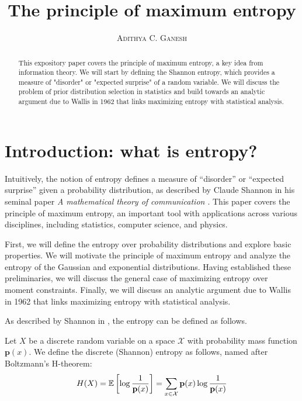\documentclass[13pt]{article}
\title{The principle of maximum entropy}
\author{\textsc{Adithya C. Ganesh}}
\newcommand{\p}{\mathbf{p}}
\begin{document}
\maketitle

\begin{abstract}
\noindent This expository paper covers the principle of maximum entropy, a key idea from information theory.  We will start by defining the Shannon entropy, which provides a measure of "disorder" or "expected surprise" of a random variable.  We will discuss the problem of prior distribution selection in statistics and build towards an analytic argument due to Wallis in 1962 that links maximizing entropy with statistical analysis.
\end{abstract}


\section{Introduction: what is entropy?}

Intuitively, the notion of entropy defines a measure of ``disorder'' or ``expected surprise'' given a probability distribution, as described by Claude Shannon in his seminal paper {\it A mathematical theory of communication \cite{shannon1948mathematical}}. This paper covers the principle of maximum entropy, an important tool with applications across various disciplines, including statistics, computer science, and physics.  

First, we will define the entropy over probability distributions and explore basic properties.  We will motivate the principle of maximum entropy and analyze the entropy of the Gaussian and exponential distributions.  Having established these preliminaries, we will discuss the general case of maximizing entropy over moment constraints.  Finally, we will discuss an analytic argument due to Wallis in 1962 that links maximizing entropy with statistical analysis.

As described by Shannon in \cite{shannon1948mathematical}, the entropy can be defined as follows. \\


\begin{definition}
  Let $X$ be a discrete random variable on a space $\mathcal{X}$ with probability mass function $\p(x)$.  We define the discrete (Shannon) entropy as follows, named after Boltzmann's H-theorem:
  \begin{align*}
    H(X) = \EE \left[ \log \frac{1}{\p(x)} \right] = \sum_{x \in \mathcal{X}} \p(x) \log \frac{1}{\p(x)}
  \end{align*}
\end{definition}
\end{document}
